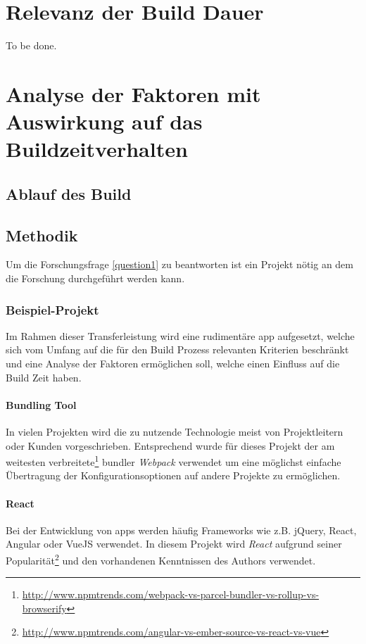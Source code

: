 \documentclass[11pt]{article}
\begin{document}
	\section{Relevanz der Build Dauer}
		To be done. %
		
	\section{Analyse der Faktoren mit Auswirkung auf das Buildzeitverhalten}
		\subsection{Ablauf des Build}
		\subsection{Methodik}
			Um die Forschungsfrage \ref{question1} zu beantworten ist ein Projekt nötig an dem die Forschung durchgeführt werden kann.
			\subsubsection{Beispiel-Projekt}
				Im Rahmen dieser Transferleistung wird eine rudimentäre \Gls{app} aufgesetzt, welche sich vom Umfang auf die für den Build Prozess relevanten Kriterien beschränkt und eine Analyse der Faktoren ermöglichen soll, welche einen Einfluss auf die Build Zeit haben.
				
				\paragraph{Bundling Tool} In vielen Projekten wird die zu nutzende Technologie meist von Projektleitern oder Kunden vorgeschrieben. Entsprechend wurde für dieses Projekt der am weitesten verbreitete\footnote{\url{http://www.npmtrends.com/webpack-vs-parcel-bundler-vs-rollup-vs-browserify}} \Gls{bundler} \emph{Webpack} verwendet um eine möglichst einfache Übertragung der Konfigurationsoptionen auf andere Projekte zu ermöglichen.
				
				\paragraph{React} Bei der Entwicklung von \Glspl{app} werden häufig Frameworks wie z.B. jQuery, React, Angular oder VueJS verwendet. In diesem Projekt wird \emph{React} aufgrund seiner Popularität\footnote{\url{http://www.npmtrends.com/angular-vs-ember-source-vs-react-vs-vue}} und den vorhandenen Kenntnissen des Authors verwendet.
				
\end{document}

